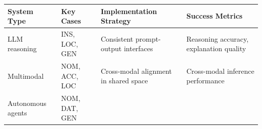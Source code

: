 \documentclass[
  11pt,
  letterpaper,
]{article}
\begin{document}
\begin{longtable}[]{@{}llll@{}}
\toprule
\begin{minipage}[b]{0.18\columnwidth}\raggedright
System Type\strut
\end{minipage} & \begin{minipage}[b]{0.15\columnwidth}\raggedright
Key Cases\strut
\end{minipage} & \begin{minipage}[b]{0.33\columnwidth}\raggedright
Implementation Strategy\strut
\end{minipage} & \begin{minipage}[b]{0.22\columnwidth}\raggedright
Success Metrics\strut
\end{minipage}\tabularnewline
\midrule
\endhead
\begin{minipage}[t]{0.18\columnwidth}\raggedright
LLM reasoning\strut
\end{minipage} & \begin{minipage}[t]{0.15\columnwidth}\raggedright
INS, LOC, GEN\strut
\end{minipage} & \begin{minipage}[t]{0.33\columnwidth}\raggedright
Consistent prompt-output interfaces\strut
\end{minipage} & \begin{minipage}[t]{0.22\columnwidth}\raggedright
Reasoning accuracy, explanation quality\strut
\end{minipage}\tabularnewline
\begin{minipage}[t]{0.18\columnwidth}\raggedright
Multimodal\strut
\end{minipage} & \begin{minipage}[t]{0.15\columnwidth}\raggedright
NOM, ACC, LOC\strut
\end{minipage} & \begin{minipage}[t]{0.33\columnwidth}\raggedright
Cross-modal alignment in shared space\strut
\end{minipage} & \begin{minipage}[t]{0.22\columnwidth}\raggedright
Cross-modal inference performance\strut
\end{minipage}\tabularnewline
\begin{minipage}[t]{0.18\columnwidth}\raggedright
Autonomous agents\strut
\end{minipage} & \begin{minipage}[t]{0.15\columnwidth}\raggedright
NOM, DAT, GEN\strut
\end{minipage} & \begin{minipage}[t]{0.33\columnwidth}\raggedright

\end{minipage}
\end{longtable}
\end{document}
